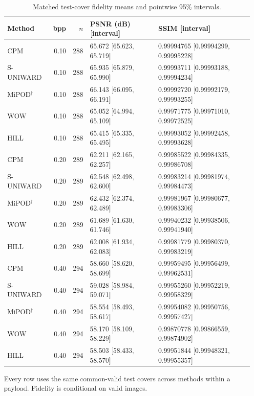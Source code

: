 \documentclass[journal]{IEEEtran}
\renewcommand{\arraystretch}{1.2}
\renewcommand{\arraystretch}{1.0}
\theoremstyle{definition}
\theoremstyle{game}
\renewcommand{\arraystretch}{1.5}
\begin{document}
\begin{table}[!t]
\centering\footnotesize
\caption{Matched test-cover fidelity means and pointwise 95\% intervals.}
\label{tab:hsm-fidelity}
\setlength{\tabcolsep}{4pt}\renewcommand{\arraystretch}{1.15}
\begin{tabular}{lrrll}
\toprule
Method & bpp & $n$ & PSNR (dB) [interval] & SSIM [interval]\\
\midrule
CPM & 0.10 & 288 & 65.672 [65.623, 65.719] & 0.99994765 [0.99994299, 0.99995228]\\
S-UNIWARD & 0.10 & 288 & 65.935 [65.879, 65.990] & 0.99993711 [0.99993188, 0.99994234]\\
MiPOD$^\dagger$ & 0.10 & 288 & 66.143 [66.095, 66.191] & 0.99992720 [0.99992179, 0.99993255]\\
WOW & 0.10 & 288 & 65.052 [64.994, 65.109] & 0.99971775 [0.99971010, 0.99972525]\\
HILL & 0.10 & 288 & 65.415 [65.335, 65.495] & 0.99993052 [0.99992458, 0.99993628]\\
CPM & 0.20 & 289 & 62.211 [62.165, 62.257] & 0.99985522 [0.99984335, 0.99986708]\\
S-UNIWARD & 0.20 & 289 & 62.548 [62.498, 62.600] & 0.99983214 [0.99981974, 0.99984473]\\
MiPOD$^\dagger$ & 0.20 & 289 & 62.432 [62.374, 62.489] & 0.99981967 [0.99980677, 0.99983306]\\
WOW & 0.20 & 289 & 61.689 [61.630, 61.746] & 0.99940232 [0.99938506, 0.99941940]\\
HILL & 0.20 & 289 & 62.008 [61.934, 62.083] & 0.99981779 [0.99980370, 0.99983219]\\
CPM & 0.40 & 294 & 58.660 [58.620, 58.699] & 0.99959495 [0.99956499, 0.99962531]\\
S-UNIWARD & 0.40 & 294 & 59.028 [58.984, 59.071] & 0.99955260 [0.99952219, 0.99958329]\\
MiPOD$^\dagger$ & 0.40 & 294 & 58.554 [58.493, 58.617] & 0.99954082 [0.99950756, 0.99957427]\\
WOW & 0.40 & 294 & 58.170 [58.109, 58.229] & 0.99870778 [0.99866559, 0.99874902]\\
HILL & 0.40 & 294 & 58.503 [58.433, 58.570] & 0.99951844 [0.99948321, 0.99955357]\\
\bottomrule
\end{tabular}
\par\smallskip\parbox{.97\textwidth}{\footnotesize Every row uses the same common-valid test covers across methods within a payload. Fidelity is conditional on valid images.}
\end{table}
\end{document}

